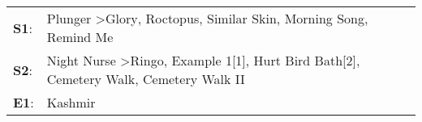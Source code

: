 \begin{supertabular}{p{0.03\textwidth}p{0.92\textwidth}}
 \textbf{S1}:  &                       Plunger\textsuperscript{} \textgreater \enspace Glory\textsuperscript{}, \enspace Roctopus\textsuperscript{}, \enspace Similar Skin\textsuperscript{}, \enspace Morning Song\textsuperscript{}, \enspace Remind Me\textsuperscript{}  \enspace  \\
 \textbf{S2}:  &  Night Nurse\textsuperscript{} \textgreater \enspace Ringo\textsuperscript{}, \enspace Example 1[1]\textsuperscript{}, \enspace Hurt Bird Bath[2]\textsuperscript{}, \enspace Cemetery Walk\textsuperscript{}, \enspace Cemetery Walk II\textsuperscript{}  \enspace  \\
 \textbf{E1}:  &                                                                                                                                                                                                                                  Kashmir\textsuperscript{}  \enspace  \\
\end{supertabular}
